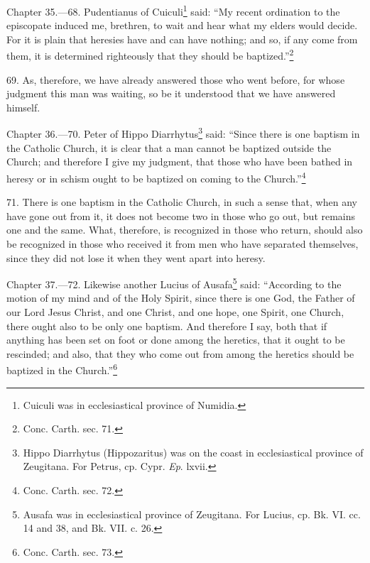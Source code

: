 
Chapter 35.—68. Pudentianus of Cuiculi\footnote{\par  Cuiculi was in ecclesiastical province of Numidia.} said: ``My recent ordination to the episcopate induced me, brethren, to wait and hear what my elders would decide. For it is plain that heresies have and can have nothing; and so, if any come from them, it is determined righteously that they should be baptized.''\footnote{\par  Conc. Carth. sec. 71.}

69. As, therefore, we have already answered those who went before, for whose judgment this man was waiting, so be it understood that we have answered himself.


Chapter 36.—70. Peter of Hippo Diarrhytus\footnote{\par  Hippo Diarrhytus (Hippozaritus) was on the coast in ecclesiastical province of Zeugitana. For Petrus, cp. Cypr. \emph{Ep}. lxvii.} said: ``Since there is one baptism in the Catholic Church, it is clear that a man cannot be baptized outside the Church; and therefore I give my judgment, that those who have been bathed in heresy or in schism ought to be baptized on coming to the Church.''\footnote{\par  Conc. Carth. sec. 72.}

71. There is one baptism in the Catholic Church, in such a sense that, when any have gone out from it, it does not become two in those who go out, but remains one and the same. What, therefore, is recognized in those who return, should also be recognized in those who received it from men who have separated themselves, since they did not lose it when they went apart into heresy.


Chapter 37.—72. Likewise another Lucius of Ausafa\footnote{\par  Ausafa was in ecclesiastical province of Zeugitana. For Lucius, cp. Bk. VI. cc. 14 and 38, and Bk. VII. c. 26.} said: ``According to the motion of my mind and of the Holy Spirit, since there is one God, the Father of our Lord Jesus Christ, and one Christ, and one hope, one Spirit, one Church, there ought also to be only one baptism. And therefore I say, both that if anything has been set on foot or done among the heretics, that it ought to be rescinded; and also, that they who come out from among the heretics should be baptized in the Church.''\footnote{\par  Conc. Carth. sec. 73.}

